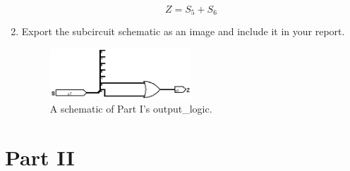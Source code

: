 \documentclass{article}
\begin{document}
\begin{enumerate}
$$Z = S_5 + S_6$$

\item Export the subcircuit schematic as an image and include it in your report.

\begin{figure}[ht!]
    \centering
    \includegraphics[width=0.5\textwidth]{lab6_part1_output.png}
    \caption{A schematic of Part I's output\_logic.}
    \label{f:part1_output_logic}
\end{figure}
\end{enumerate}

\clearpage
\section{Part II}
\end{document}
